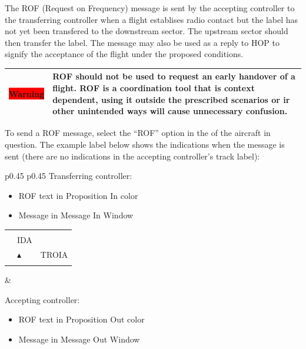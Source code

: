 \documentclass[a4paper,oneside,11pt]{memoir}
\newcommand{\colorref}[1]{\colorbox{Flight Highlight}{\color{#1}#1}}
\newcommand{\winref}[1]{\textit{\titleref{#1}}}
\newcommand{\warn}[1]{
  \begin{center}
    
    \begin{tabular}{| P{1.5cm}|p{10.5cm} |}
      \hline
      \cellcolor{shadecolor}\colorbox{red}{\color{white}Warning} &\cellcolor{shadecolor} #1 \\ \hline
    \end{tabular}
  \end{center}
}
\begin{document}
The ROF (Request on Frequency) message is sent by the accepting controller to the transferring controller when a flight establises radio contact but the label has not yet been transfered to the downstream sector. The upstream sector should then transfer the label. The message may also be used as a reply to HOP to signify the acceptance of the flight under the proposed conditions.

\warn{ROF should not be used to request an early handover of a flight. ROF is a coordination tool that is context dependent, using it outside the prescribed scenarios or ir other unintended ways will cause unnecessary confusion.}

To send a ROF message, select the “ROF” option in the \winref{menu:cs} of the aircraft in question. The example label below shows the indications when the message is sent (there are no indications in the accepting controller’s track label):


\begin{longtable}{p{} p{}}
  Transferring controller:

  \begin{itemize}
    \item ROF text in \colorref{Proposition In} color
    \item Message in Message In Window
  \end{itemize}

  \begin{tabular}{
    >{\columncolor{Flight Highlight}}l 
    >{\columncolor{Flight Highlight}}l
    >{\columncolor{Flight Highlight}}l }
    {\color{Proposition In} ROF} & {\color{Coordination} }       & {\color{Assumed} }      \\
    {\color{Assumed} ABC123} & {\color{Coordination} IDA}       & {\color{Assumed} }      \\
    {\color{Assumed} 100}    & {\color{Assumed} $\blacktriangle$} & {\color{Assumed} TROIA} \\
    {\color{Assumed} 180}    & {\color{Assumed} }          & {\color{Assumed} }     
  \end{tabular}
  &
  
  Accepting controller:

  \begin{itemize}
    \item ROF text in \colorref{Proposition Out} color
    \item Message in Message Out Window
  \end{itemize}
\end{longtable}
\end{document}
